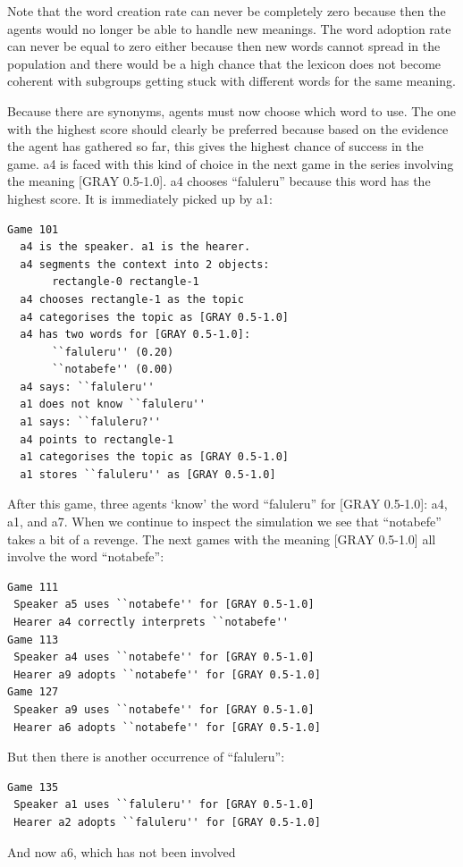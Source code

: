 Note that the word creation 
rate can never be completely zero because then the agents
would no longer be able to handle new meanings. The word 
adoption rate can never be equal to zero either because then 
new words cannot spread in the population and there
would be a high chance that the lexicon does not become coherent
with subgroups getting stuck with different
words for the same meaning. 

Because there are synonyms, agents must now choose
which word to use. The one with the highest
score should clearly be preferred because based on the
evidence the agent has gathered so far, this
gives the highest chance of success in the game. {\bfshape  a4}
is faced with this kind of choice in 
the next game in the series involving the meaning
{}[GRAY 0.5-1.0]. {\bfshape  a4} chooses ``faluleru'' because this 
word has the highest score. It is immediately picked up by 
{\bfshape  a1}: 
\begin{verbatim}
Game 101
  a4 is the speaker. a1 is the hearer. 
  a4 segments the context into 2 objects: 
       rectangle-0 rectangle-1
  a4 chooses rectangle-1 as the topic 
  a4 categorises the topic as [GRAY 0.5-1.0]
  a4 has two words for [GRAY 0.5-1.0]:
       ``faluleru'' (0.20)
       ``notabefe'' (0.00)
  a4 says: ``faluleru''
  a1 does not know ``faluleru''
  a1 says: ``faluleru?''
  a4 points to rectangle-1
  a1 categorises the topic as [GRAY 0.5-1.0]
  a1 stores ``faluleru'' as [GRAY 0.5-1.0]
\end{verbatim}
After this game, three agents `know' the word 
``faluleru'' for [GRAY 0.5-1.0]: {\bfshape  a4}, {\bfshape  a1}, 
and {\bfshape  a7}. When we continue to inspect the
simulation we see that ``notabefe'' takes a bit of 
a revenge. The next games with the 
meaning [GRAY 0.5-1.0] all involve the word ``notabefe'': 
\begin{verbatim}
Game 111
 Speaker a5 uses ``notabefe'' for [GRAY 0.5-1.0]
 Hearer a4 correctly interprets ``notabefe''
Game 113
 Speaker a4 uses ``notabefe'' for [GRAY 0.5-1.0]
 Hearer a9 adopts ``notabefe'' for [GRAY 0.5-1.0]
Game 127
 Speaker a9 uses ``notabefe'' for [GRAY 0.5-1.0]
 Hearer a6 adopts ``notabefe'' for [GRAY 0.5-1.0]
\end{verbatim}
But then there is another occurrence of ``faluleru'': 
\begin{verbatim}
Game 135 
 Speaker a1 uses ``faluleru'' for [GRAY 0.5-1.0]
 Hearer a2 adopts ``faluleru'' for [GRAY 0.5-1.0]
\end{verbatim}
And now {\bfshape  a6}, which has not been involved 

